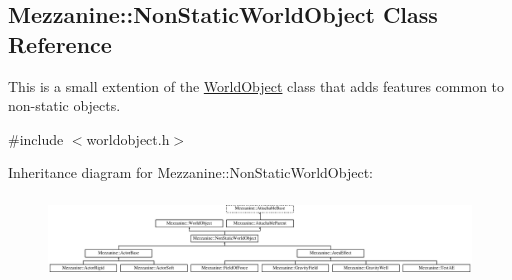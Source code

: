 \hypertarget{classMezzanine_1_1NonStaticWorldObject}{
\subsection{Mezzanine::NonStaticWorldObject Class Reference}
\label{classMezzanine_1_1NonStaticWorldObject}
}


This is a small extention of the \hyperlink{classMezzanine_1_1WorldObject}{WorldObject} class that adds features common to non-\/static objects.  




{\ttfamily \#include $<$worldobject.h$>$}

Inheritance diagram for Mezzanine::NonStaticWorldObject:\begin{figure}[H]
\begin{center}
\leavevmode
\includegraphics[height=2.211690cm]{classMezzanine_1_1NonStaticWorldObject}
\end{center}
\end{figure}
